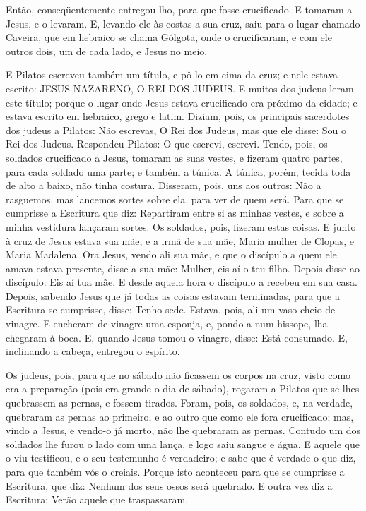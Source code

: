 Então, conseqüentemente entregou-lho, para que fosse crucificado.
E tomaram a Jesus, e o levaram. E, levando ele às costas a
sua cruz, saiu para o lugar chamado Caveira, que em hebraico se
chama Gólgota, onde o crucificaram, e com ele outros dois, um
de cada lado, e Jesus no meio.

E Pilatos escreveu também um título, e pô-lo em cima da cruz; e
nele estava escrito: JESUS NAZARENO, O REI DOS JUDEUS. E
muitos dos judeus leram este título; porque o lugar onde Jesus
estava crucificado era próximo da cidade; e estava escrito em
hebraico, grego e latim. Diziam, pois, os principais
sacerdotes dos judeus a Pilatos: Não escrevas, O Rei dos Judeus, mas
que ele disse: Sou o Rei dos Judeus. Respondeu Pilatos: O que
escrevi, escrevi. Tendo, pois, os soldados crucificado a
Jesus, tomaram as suas vestes, e fizeram quatro partes, para cada
soldado uma parte; e também a túnica. A túnica, porém, tecida toda
de alto a baixo, não tinha costura. Disseram, pois, uns aos
outros: Não a rasguemos, mas lancemos sortes sobre ela, para ver de
quem será. Para que se cumprisse a Escritura que diz: Repartiram
entre si as minhas vestes, e sobre a minha vestidura lançaram
sortes. Os soldados, pois, fizeram estas coisas. E junto à
cruz de Jesus estava sua mãe, e a irmã de sua mãe, Maria mulher de
Clopas, e Maria Madalena. Ora Jesus, vendo ali sua mãe, e que
o discípulo a quem ele amava estava presente, disse a sua mãe:
Mulher, eis aí o teu filho. Depois disse ao discípulo: Eis aí
tua mãe. E desde aquela hora o discípulo a recebeu em sua casa.
Depois, sabendo Jesus que já todas as coisas estavam
terminadas, para que a Escritura se cumprisse, disse: Tenho sede.
Estava, pois, ali um vaso cheio de vinagre. E encheram de
vinagre uma esponja, e, pondo-a num hissope, lha chegaram à boca.
E, quando Jesus tomou o vinagre, disse: Está consumado. E,
inclinando a cabeça, entregou o espírito.

Os judeus, pois, para que no sábado não ficassem os corpos na
cruz, visto como era a preparação (pois era grande o dia de sábado),
rogaram a Pilatos que se lhes quebrassem as pernas, e fossem
tirados. Foram, pois, os soldados, e, na verdade, quebraram
as pernas ao primeiro, e ao outro que como ele fora crucificado;
mas, vindo a Jesus, e vendo-o já morto, não lhe quebraram as
pernas. Contudo um dos soldados lhe furou o lado com uma
lança, e logo saiu sangue e água. E aquele que o viu
testificou, e o seu testemunho é verdadeiro; e sabe que é verdade o
que diz, para que também vós o creiais. Porque isto aconteceu
para que se cumprisse a Escritura, que diz: Nenhum dos seus ossos
será quebrado. E outra vez diz a Escritura: Verão aquele que
traspassaram.

